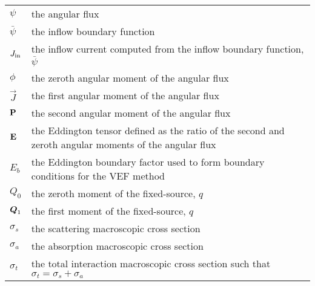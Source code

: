 \documentclass[../doc.tex]{subfiles}
\begin{document}
\begin{longtable}{p{2cm}p{12cm}}
$\psi$ & the angular flux \\
$\bar{\psi}$ & the inflow boundary function \\
$\Jin$ & the inflow current computed from the inflow boundary function, $\bar{\psi}$ \\
$\phi$ & the zeroth angular moment of the angular flux \\
$\vec{J}$ & the first angular moment of the angular flux \\
$\P$ & the second angular moment of the angular flux \\
$\E$ & the Eddington tensor defined as the ratio of the second and zeroth angular moments of the angular flux \\
$E_b$ & the Eddington boundary factor used to form boundary conditions for the VEF method \\
$Q_0$ & the zeroth moment of the fixed-source, $q$ \\
$\Qone$ & the first moment of the fixed-source, $q$ \\
$\sigma_s$ & the scattering macroscopic cross section \\
$\sigma_a$ & the absorption macroscopic cross section \\
$\sigma_t$ & the total interaction macroscopic cross section such that $\sigma_t = \sigma_s + \sigma_a$ \\ 
\end{longtable}
\end{document}
